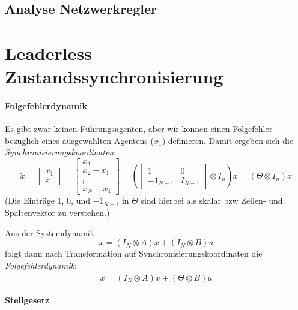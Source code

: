\subsection{Analyse Netzwerkregler}



\section{Leaderless Zustandssynchronisierung}
\paragraph{Folgefehlerdynamik}
Es gibt zwar keinen Führungsagenten, aber wir können einen Folgefehler
bezüglich eines ausgewählten Agentens ($x_1$) definieren.
Damit ergeben sich die \emph{Synchronisierungskoordinaten}:
\begin{equation}
    \tilde{x} = \begin{bmatrix}
        x_1 \\
        \varepsilon
    \end{bmatrix}
    = \begin{bmatrix}
        x_1 \\
        x_2 - x_1 \\
        \vdots \\
        x_N - x_1
    \end{bmatrix}
    = \left(\begin{bmatrix}
        1 & 0 \\
        -1_{N-1} & I_{N-1}
    \end{bmatrix}
    \otimes I_n
    \right) x
    = (\Theta \otimes I_n)x
\end{equation}
(Die Einträge $1$, $0$, und $-1_{N-1}$ in $\Theta$ sind hierbei als skalar bzw Zeilen- und Spaltenvektor zu verstehen.)

Aus der Systemdynamik
\begin{equation}
    \dot{x} = (I_N \otimes A) x + (I_N \otimes B)u
\end{equation}
folgt dann nach Transformation auf Synchronisierungskoordinaten die
\emph{Folgefehlerdynamik}:
\begin{equation}
    \dot{\tilde{x}} = (I_N \otimes A) \tilde{x} + (\Theta \otimes B)u
\end{equation}

\paragraph{Stellgesetz}

